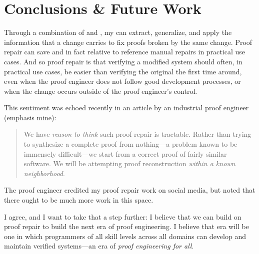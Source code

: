 \chapter{Conclusions \& Future Work}
\label{chapt:conclusions}

Through a combination of  and ,
my   can extract, generalize, and apply the information that a change carries to fix proofs broken by the same change.
Proof repair can save and in fact  relative to reference manual repairs in practical use cases.
And so proof repair is  that verifying a modified system should often, in practical use cases, be easier than verifying the original the first time around,
even when the proof engineer does not follow good development processes,
or when the change occurs outside of the proof engineer's control.

This sentiment was echoed recently in an article by an industrial proof engineer~\cite{article} (emphasis mine):

\begin{quote}
We have \textit{reason to think} such proof repair is tractable. Rather than trying to synthesize a complete proof from nothing---a problem known to be immensely difficult---we 
start from a correct proof of fairly similar software. We will be attempting proof reconstruction \textit{within a known neighborhood}.
\end{quote}
The proof engineer credited my proof repair work on social media, %
but noted that there ought to be much more work in this space.

I agree, and I want to take that a step further:
I believe that we can build on proof repair to build the next era of proof engineering.
I believe that era will be one in which programmers of all skill levels across all domains can develop and maintain verified systems---an
era of \textit{proof engineering for all}.


